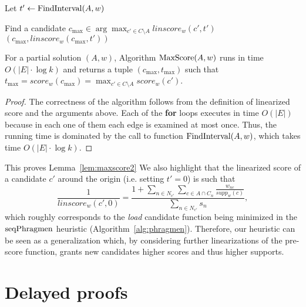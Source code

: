 \begin{algorithm}[htb]\label{alg:maxscore}
\SetAlgoLined
{}
Let $t'\leftarrow \operatorname{FindInterval}(A,w)$\;

Find a candidate $c_{\max}\in\arg\max_{c'\in C\setminus A} linscore_w(c',t')$\;
\Return $(c_{\max}, linscore_w(c_{\max},t'))$\;
 \caption{$\maxscore(A,w)$}
\end{algorithm}

\begin{lemma}\label{lem:maxscore}
For a partial solution $(A,w)$, Algorithm $\maxscore(A,w)$ runs in time $O(|E|\cdot \log k)$ and returns a tuple $(c_{\max}, t_{\max})$ such that $t_{\max}=score_w(c_{\max})=\max_{c'\in C\setminus A} score_w(c')$.
\end{lemma}
\begin{proof}
The correctness of the algorithm follows from the definition of linearized score and the arguments above. Each of the \textbf{for} loops executes in time $O(|E|)$ because in each one of them each edge is examined at most once. Thus, the running time is dominated by the call to function $\operatorname{FindInterval}(A,w)$, which takes time $O(|E|\cdot \log k)$.
\end{proof}

This proves Lemma~\ref{lem:maxscore2}
We also highlight that the linearized score of a candidate $c'$ around the origin (i.e. setting $t'=0$) is such that %
%
$$\frac{1}{linscore_w(c',0)}=\frac{1+\sum_{n\in N_{c'}} \sum_{c\in A\cap C_n} \frac{w_{nc}}{supp_w(c)}}{\sum_{n\in N_{c'}} s_n},$$
%
which roughly corresponds to the \emph{load} candidate function being minimized in the $\operatorname{seqPhragmen}$ heuristic (Algorithm~\ref{alg:phragmen}). Therefore, our heuristic can be seen as a generalization which, by considering further linearizations of the pre-score function, grants new candidates higher scores and thus higher supports. 

\section{Delayed proofs}\label{s:proofs}

